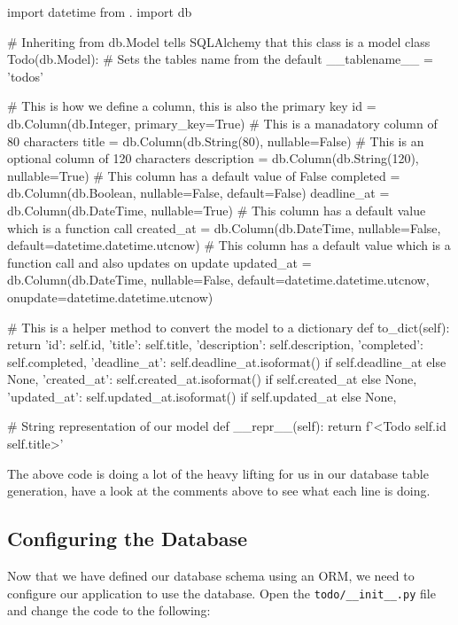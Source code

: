 \documentclass{csse4400}
\begin{document}
\begin{code}[language=python,numbers=none]{}
  import datetime
  from . import db

  # Inheriting from db.Model tells SQLAlchemy that this class is a model
  class Todo(db.Model):
      # Sets the tables name from the default
      __tablename__ = 'todos'

      # This is how we define a column, this is also the primary key
      id = db.Column(db.Integer, primary_key=True)
      # This is a manadatory column of 80 characters
      title = db.Column(db.String(80), nullable=False)
      # This is an optional column of 120 characters
      description = db.Column(db.String(120), nullable=True)
      # This column has a default value of False
      completed = db.Column(db.Boolean, nullable=False, default=False)
      deadline_at = db.Column(db.DateTime, nullable=True)
      # This column has a default value which is a function call
      created_at = db.Column(db.DateTime, nullable=False, default=datetime.datetime.utcnow)
      # This column has a default value which is a function call and also updates on update
      updated_at = db.Column(db.DateTime, nullable=False, default=datetime.datetime.utcnow, onupdate=datetime.datetime.utcnow)

      # This is a helper method to convert the model to a dictionary
      def to_dict(self):
          return {
              'id': self.id,
              'title': self.title,
              'description': self.description,
              'completed': self.completed,
              'deadline_at': self.deadline_at.isoformat() if self.deadline_at else None,
              'created_at': self.created_at.isoformat() if self.created_at else None,
              'updated_at': self.updated_at.isoformat() if self.updated_at else None,
          }

      # String representation of our model
      def __repr__(self):
          return f'<Todo {self.id} {self.title}>'
\end{code}

The above code is doing a lot of the heavy lifting for us in our database table generation,
have a look at the comments above to see what each line is doing.


\subsection{Configuring the Database}

Now that we have defined our database schema using an ORM,
we need to configure our application to use the database.
Open the \texttt{todo/\_\_init\_\_.py} file and change the code to the following:
\end{document}
